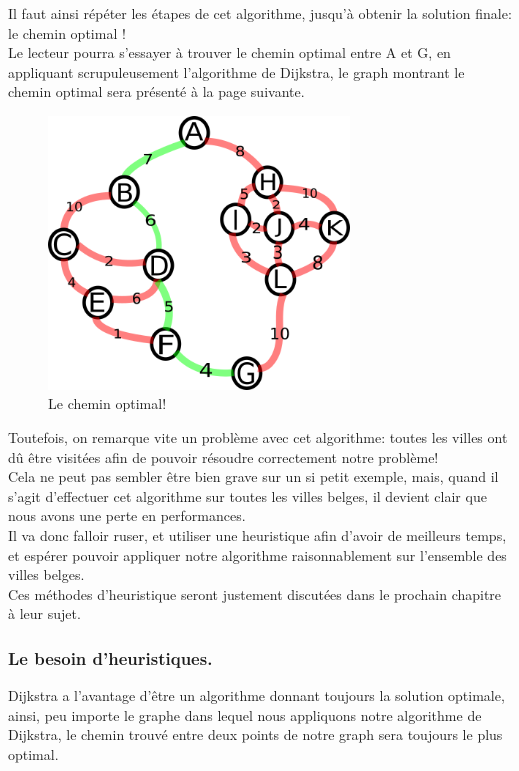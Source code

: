\documentclass[a4paper, 12pt]{article}
\numberwithin{equation}{subsection}
\begin{document}
Il faut ainsi répéter les étapes de cet algorithme, jusqu'à obtenir la solution finale: le chemin optimal ! \\

Le lecteur pourra s'essayer à trouver le chemin optimal entre A et G, en appliquant scrupuleusement l'algorithme de Dijkstra, le graph montrant le chemin optimal sera présenté à la page suivante.
\begin{figure}[!hbt]
  \centering
  \includegraphics[width=8.0cm]{imgs/solved.png}
  \caption{Le chemin optimal!}
\end{figure}
Toutefois, on remarque vite un problème avec cet algorithme: toutes les villes ont dû être visitées afin de pouvoir résoudre correctement notre problème! \\

Cela ne peut pas sembler être bien grave sur un si petit exemple, mais, quand il s'agit d'effectuer cet algorithme sur toutes les villes belges, il devient clair que nous avons une perte en performances.\\

Il va donc falloir ruser, et utiliser une heuristique afin d'avoir de meilleurs temps, et espérer pouvoir appliquer notre algorithme raisonnablement sur l'ensemble des villes belges. \\

Ces méthodes d'heuristique seront justement discutées dans le prochain chapitre à leur sujet. \\
\subsubsection{Le besoin d'heuristiques.}

Dijkstra a l'avantage d'être un algorithme donnant toujours la solution optimale, ainsi, peu importe le graphe dans lequel nous appliquons notre algorithme de Dijkstra, le chemin trouvé entre deux points de notre graph sera toujours le plus optimal. \\
\end{document}
